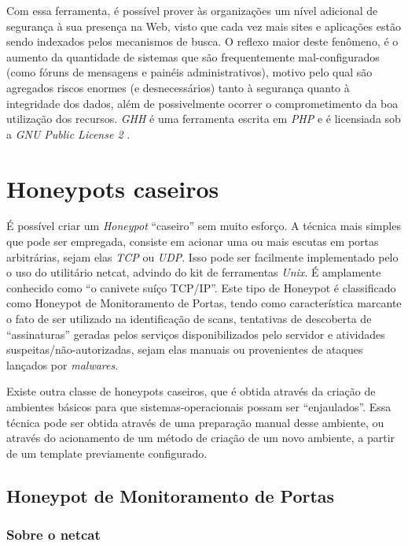 Com essa ferramenta, é possível prover às organizações um nível adicional de segurança à sua presença na Web, visto que cada vez mais sites e aplicações estão sendo indexados pelos mecanismos de busca. O reflexo maior deste fenômeno, é o aumento da quantidade de sistemas que são frequentemente mal-configurados (como fóruns de mensagens e painéis administrativos), motivo pelo qual são agregados riscos enormes (e desnecessários) tanto à segurança quanto à integridade dos dados, além de possivelmente ocorrer o comprometimento da boa utilização dos recursos. \textit{GHH} é uma ferramenta escrita em \textit{PHP} e é licensiada sob a \textit{GNU Public License 2} \cite{GPL2}.


\section{Honeypots caseiros}

É possível criar um \textit{Honeypot} ``caseiro'' sem muito esforço. A técnica mais simples que pode ser empregada, consiste em acionar uma ou mais escutas em portas arbitrárias, sejam elas \textit{TCP} ou \textit{UDP}. Isso pode ser facilmente implementado pelo o uso do utilitário netcat, advindo do kit de ferramentas \textit{Unix}. É amplamente conhecido como ``o canivete suíço TCP/IP''. Este tipo de Honeypot é classificado como Honeypot de Monitoramento de Portas, tendo como característica marcante o fato de ser utilizado na identificação de scans, tentativas de descoberta de ``assinaturas'' geradas pelos serviços disponibilizados pelo servidor e atividades suspeitas/não-autorizadas, sejam elas manuais ou provenientes de ataques lançados por \textit{malwares}. \cite{Honeycomb}

Existe outra classe de honeypots caseiros, que é obtida através da criação de ambientes básicos para que sistemas-operacionais possam ser ``enjaulados''. Essa técnica pode ser obtida através de uma preparação manual desse ambiente, ou através do acionamento de um método de criação de um novo ambiente, a partir de um template previamente configurado.

\subsection{Honeypot de Monitoramento de Portas}

\subsubsection{Sobre o netcat}

